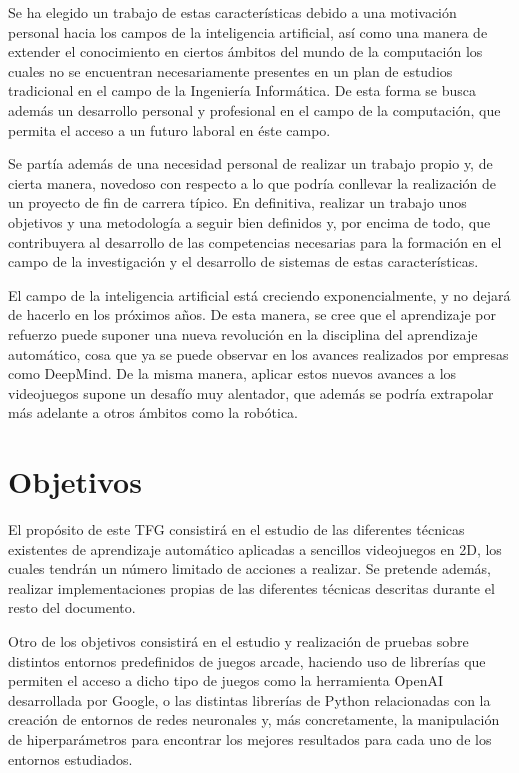 \documentclass[11pt,spanish,listoffigures,listoftables]{tfgetsinf}
\begin{document}
Se ha elegido un trabajo de estas características debido a una motivación personal hacia los campos de la inteligencia artificial, así como una manera de extender el conocimiento en ciertos ámbitos del mundo de la computación los cuales no se encuentran necesariamente presentes en un plan de estudios tradicional en el campo de la Ingeniería Informática. De esta forma se busca además un desarrollo personal y profesional en el campo de la computación, que permita el acceso a un futuro laboral en éste campo.  \par 

Se partía además de una necesidad personal de realizar un trabajo propio y, de cierta manera, novedoso con respecto a lo que podría conllevar la realización de un proyecto de fin de carrera típico. En definitiva, realizar un trabajo unos objetivos y una metodología a seguir bien definidos y, por encima de todo, que contribuyera al desarrollo de las competencias necesarias para la formación en el campo de la investigación y el desarrollo de sistemas de estas características. 

El campo de la inteligencia artificial está creciendo exponencialmente, y no dejará de hacerlo en los próximos años. De esta manera, se cree que el aprendizaje por refuerzo puede suponer una nueva revolución en la disciplina del aprendizaje automático, cosa que ya se puede observar en los avances realizados por empresas como DeepMind. De la misma manera, aplicar estos nuevos avances a los videojuegos supone un desafío muy alentador, que además se podría extrapolar más adelante a otros ámbitos como la robótica.

\section{Objetivos}

El propósito de este TFG consistirá en el estudio de las diferentes técnicas existentes de aprendizaje automático aplicadas a sencillos videojuegos en 2D, los cuales tendrán un número limitado de acciones a realizar. Se pretende además, realizar implementaciones propias de las diferentes técnicas descritas durante el resto del documento. \par 

Otro de los objetivos consistirá en el estudio y realización de pruebas sobre distintos entornos predefinidos de juegos arcade, haciendo uso de librerías que permiten el acceso a dicho tipo de juegos como la herramienta OpenAI desarrollada por Google, o las distintas librerías de Python relacionadas con la creación de entornos de redes neuronales y, más concretamente, la manipulación de hiperparámetros para encontrar los mejores resultados para cada uno de los entornos estudiados. \par 
\end{document}
